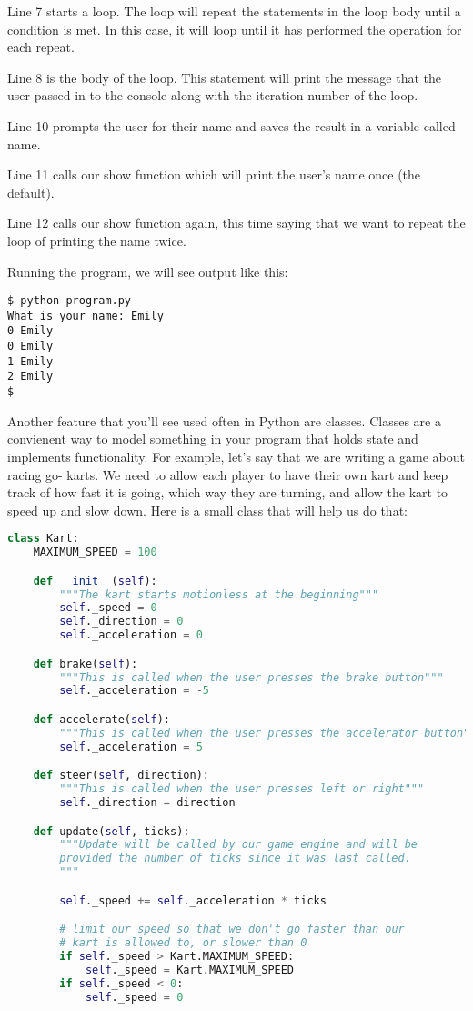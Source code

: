 Line 7 starts a loop. The loop will repeat the statements in the loop body until
a condition is met. In this case, it will loop until it has performed the operation
for each repeat.

Line 8 is the body of the loop. This statement will print the message that the user
passed in to the console along with the iteration number of the loop.

Line 10 prompts the user for their name and saves the result in a variable called
name.

Line 11 calls our show function which will print the user's name once (the default).

Line 12 calls our show function again, this time saying that we want to repeat the
loop of printing the name twice.\newline

Running the program, we will see output like this:
\begin{verbatim}
$ python program.py
What is your name: Emily
0 Emily
0 Emily
1 Emily
2 Emily
$
\end{verbatim}

Another feature that you'll see used often in Python are classes. Classes are a
convienent way to model something in your program that holds state and implements
functionality. For example, let's say that we are writing a game about racing go-
karts. We need to allow each player to have their own kart and keep track of how
fast it is going, which way they are turning, and allow the kart to speed up and
slow down. Here is a small class that will help us do that:

\begin{lstlisting}[language=Python,caption=An example of a Python class]
class Kart:
    MAXIMUM_SPEED = 100

    def __init__(self):
        """The kart starts motionless at the beginning"""
        self._speed = 0
        self._direction = 0
        self._acceleration = 0

    def brake(self):
        """This is called when the user presses the brake button"""
        self._acceleration = -5

    def accelerate(self):
        """This is called when the user presses the accelerator button"""
        self._acceleration = 5

    def steer(self, direction):
        """This is called when the user presses left or right"""
        self._direction = direction

    def update(self, ticks):
        """Update will be called by our game engine and will be
        provided the number of ticks since it was last called.
        """

        self._speed += self._acceleration * ticks

        # limit our speed so that we don't go faster than our
        # kart is allowed to, or slower than 0
        if self._speed > Kart.MAXIMUM_SPEED:
            self._speed = Kart.MAXIMUM_SPEED
        if self._speed < 0:
            self._speed = 0
\end{lstlisting}

